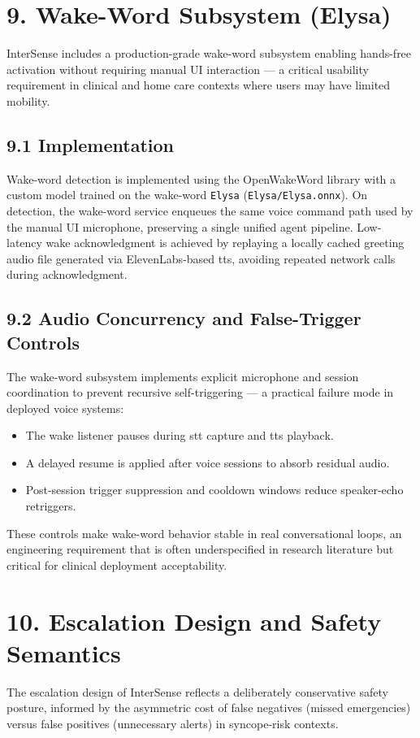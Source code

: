 \documentclass[11pt,a4paper]{article}
\begin{document}
\section{9. Wake-Word Subsystem (Elysa)}
InterSense includes a production-grade wake-word subsystem enabling hands-free activation without requiring manual UI interaction — a critical usability requirement in clinical and home care contexts where users may have limited mobility.

\subsection{9.1 Implementation}
Wake-word detection is implemented using the OpenWakeWord library with a custom model trained on the wake-word \texttt{Elysa} (\texttt{Elysa/Elysa.onnx}). On detection, the wake-word service enqueues the same voice command path used by the manual UI microphone, preserving a single unified agent pipeline. Low-latency wake acknowledgment is achieved by replaying a locally cached greeting audio file generated via ElevenLabs-based \gls{tts}, avoiding repeated network calls during acknowledgment.

\subsection{9.2 Audio Concurrency and False-Trigger Controls}
The wake-word subsystem implements explicit microphone and session coordination to prevent recursive self-triggering — a practical failure mode in deployed voice systems:
\begin{itemize}[leftmargin=1.4em]
\item The wake listener pauses during \gls{stt} capture and \gls{tts} playback.
  \item A delayed resume is applied after voice sessions to absorb residual audio.
  \item Post-session trigger suppression and cooldown windows reduce speaker-echo retriggers.
\end{itemize}
These controls make wake-word behavior stable in real conversational loops, an engineering requirement that is often underspecified in research literature but critical for clinical deployment acceptability.

\section{10. Escalation Design and Safety Semantics}
The escalation design of InterSense reflects a deliberately conservative safety posture, informed by the asymmetric cost of false negatives (missed emergencies) versus false positives (unnecessary alerts) in \gls{syncope}-risk contexts.
\end{document}
